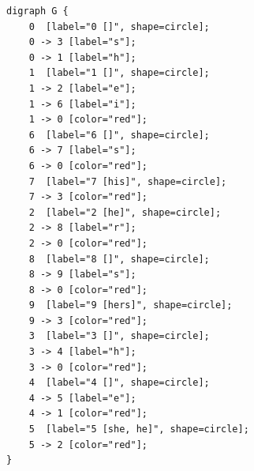 \documentclass[10pt]{report}
\begin{document}
\begin{verbatim}
digraph G {
	0  [label="0 []", shape=circle];
	0 -> 3 [label="s"];
	0 -> 1 [label="h"];
	1  [label="1 []", shape=circle];
	1 -> 2 [label="e"];
	1 -> 6 [label="i"];
	1 -> 0 [color="red"];
	6  [label="6 []", shape=circle];
	6 -> 7 [label="s"];
	6 -> 0 [color="red"];
	7  [label="7 [his]", shape=circle];
	7 -> 3 [color="red"];
	2  [label="2 [he]", shape=circle];
	2 -> 8 [label="r"];
	2 -> 0 [color="red"];
	8  [label="8 []", shape=circle];
	8 -> 9 [label="s"];
	8 -> 0 [color="red"];
	9  [label="9 [hers]", shape=circle];
	9 -> 3 [color="red"];
	3  [label="3 []", shape=circle];
	3 -> 4 [label="h"];
	3 -> 0 [color="red"];
	4  [label="4 []", shape=circle];
	4 -> 5 [label="e"];
	4 -> 1 [color="red"];
	5  [label="5 [she, he]", shape=circle];
	5 -> 2 [color="red"];
}
\end{verbatim}
\end{document}
